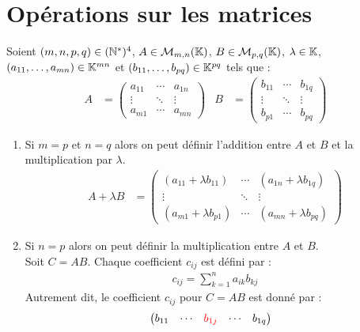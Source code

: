 \section{Opérations sur les matrices}
\begin{definition}
	Soient $(m,n,p,q) \in (\mathbb{N}^*)^4$, $A \in \mathcal{M}_{m, n}(\mathbb{K})$, $B \in \mathcal{M}_{p, q}(\mathbb{K})$, $\lambda \in \mathbb{K}$, $(a_{11}, \ldots, a_{mn}) \in \mathbb{K}^{mn}$ et $(b_{11}, \ldots, b_{pq}) \in \mathbb{K}^{pq}$ tels que :
	\begin{align*}
		A &=
		\begin{pmatrix}
			a_{11} & \cdots & a_{1n} \\
			\vdots & \ddots & \vdots \\
			a_{m1} & \cdots & a_{mn}
		\end{pmatrix}
		&
		B &= 
		\begin{pmatrix}
			b_{11} & \cdots & b_{1q} \\
			\vdots & \ddots & \vdots \\
			b_{p1} & \cdots & b_{pq}
		\end{pmatrix}
	\end{align*}
	\begin{enumerate}
		\item Si $m = p$ et $n = q$ alors on peut définir l'addition entre $A$ et $ B$ et la multiplication par $\lambda$.
		\begin{align*}
			A + \lambda B &= 
			\begin{pmatrix}
				(a_{11} + \lambda b_{11}) & \cdots & (a_{1n} + \lambda b_{1q}) \\
				\vdots & \ddots & \vdots \\
				(a_{m1} + \lambda b_{p1}) & \cdots & (a_{mn} + \lambda b_{pq})
			\end{pmatrix}
		\end{align*}
		\item Si $n = p$ alors on peut définir la multiplication entre $A$ et $B$.\\
		Soit $C = AB$. Chaque coefficient $c_{ij}$ est défini par :
		\begin{align*}
			c_{ij} = \sum_{k=1}^{n} a_{ik} b_{kj}
		\end{align*}
        Autrement dit, le coefficient $c_{ij}$ pour $C = AB$ est donné par :
        \begin{align*}
            &\begin{pmatrix}
                b_{11} & \cdots & \color{red}b_{1j} & \cdots & b_{1q} \\

\end{pmatrix}
\end{align*}
\end{enumerate}
\end{definition}
